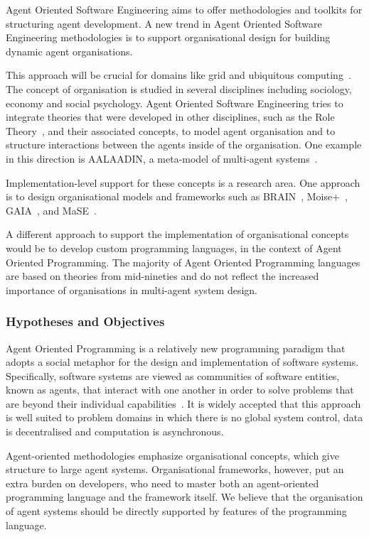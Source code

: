 \documentclass[a4paper,12pt,oneside,fleqn]{book} %
\begin{document}
Agent Oriented Software Engineering aims to offer methodologies and
toolkits for structuring agent development. A new trend in Agent Oriented
Software Engineering methodologies is to support organisational design for
building dynamic agent organisations.

This approach will be crucial for domains like grid and ubiquitous
computing~\cite{luck2005agent}. The concept of organisation is studied in
several disciplines including sociology, economy and social psychology.
Agent Oriented Software Engineering tries to integrate theories that were
developed in other disciplines, such as the Role
Theory~\cite{biddle1986recent}, and their associated concepts, to model
agent organisation and to structure interactions between the agents inside
of the organisation. One example in this direction is AALAADIN, a
meta-model of multi-agent systems~\cite{ferber1998meta}.

Implementation-level support for these concepts is a research area. One
approach is to design organisational models and frameworks such as
BRAIN~\cite{DBLP:conf/coopis/CabriLZ03},
Moise+~\cite{DBLP:conf/atal/HubnerSB02},
GAIA~\cite{DBLP:journals/aamas/WooldridgeJK00}, and
MaSE~\cite{deloach2001analysis}.

A different approach to support the implementation of organisational
concepts would be to develop custom programming languages, in the context
of Agent Oriented Programming. The majority of Agent Oriented Programming
languages are based on theories from mid-nineties and do not reflect the
increased importance of organisations in multi-agent system design.

\subsubsection{Hypotheses and Objectives}
Agent Oriented Programming is a relatively new programming paradigm that
adopts a social metaphor for the design and implementation of software
systems.  Specifically, software systems are viewed as communities of
software entities, known as agents, that interact with one another in order
to solve problems that are beyond their individual
capabilities~\cite{DBLP:journals/ai/Shoham93}. It is widely accepted that
this approach is well suited to problem domains in which there is no global
system control, data is decentralised and computation is asynchronous.

Agent-oriented methodologies emphasize organisational concepts, which give
structure to large agent systems. Organisational frameworks, however, put
an extra burden on developers, who need to master both an agent-oriented
programming language and the framework itself. We believe that the
organisation of agent systems should be directly supported by features of
the programming language.
\end{document}
